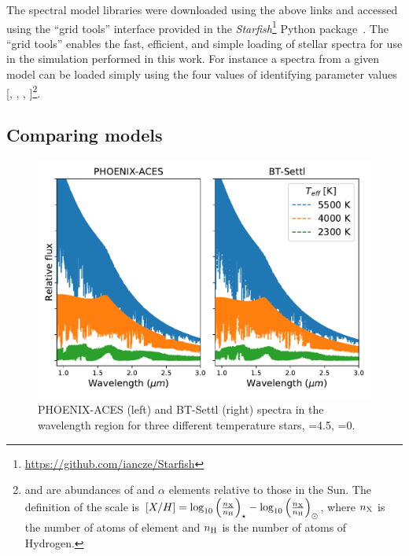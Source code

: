 The spectral model libraries were downloaded using the above links and accessed using the ``grid tools'' interface provided in the \emph{Starfish}\footnote{\url{https://github.com/iancze/Starfish}} Python package~\citep{czekala_constructing_2015}.
The ``grid tools'' enables the fast, efficient, and simple loading of stellar spectra for use in the simulation performed in this work.
For instance a spectra from a given model can be loaded simply using the four values of identifying parameter values [\Teff{}, \logg{}, \feh{}, \alphafe{}]\footnote{\feh{} and \alphafe{} are abundances of  and \(\alpha\) elements relative to those in the Sun.
    The definition of the scale is \([X/H] = \log_{10}{\left(\frac{n_{\ce{X}}}{n_{\ce{H}}}\right)}_{\star} - \log_{10}{\left(\frac{n_{\ce{X}}}{n_{\ce{H}}}\right)}_{\odot}\), where $n_{\ce{X}}$ is the number of atoms of element  and $n_{\ce{H}}$ is the number of atoms of Hydrogen.}.


\subsection{Comparing models}
\label{subsec:phoenix_comparision}
 \begin{figure}
    \centering
    \includegraphics[width=0.5\linewidth]{figures/atmos_and_models/phoenix_large_scale_comparision}
    \caption[Large scale comparison between the {PHEONIX-ACES} and {BT-Settl} spectra.]{{PHOENIX-ACES} (left) and {BT-Settl} (right) spectra in the \nir{} wavelength region for three different temperature stars, \logg{}=4.5, \feh{}=0.}
    \label{fig:phoenixlargescalecomparision}
\end{figure}

